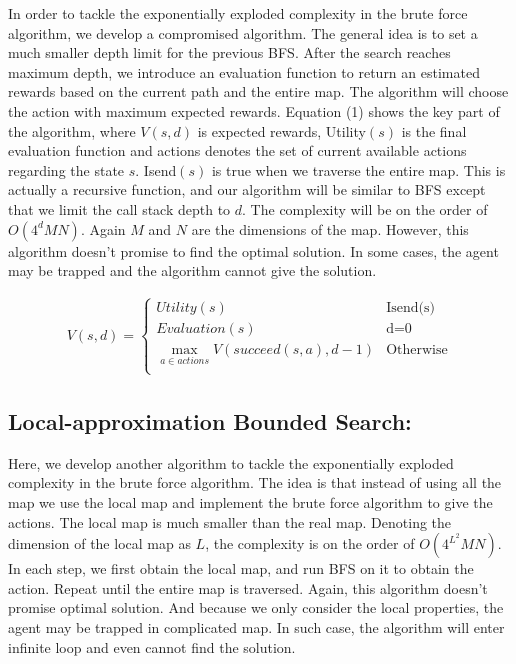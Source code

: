 \documentclass{article}
\begin{document}
\begin{normalsize}
                In order to tackle the exponentially exploded complexity in the brute force algorithm, we develop a compromised algorithm. The general idea is to set a much smaller depth limit for the previous BFS. After the search reaches maximum depth, we introduce an evaluation function to return an estimated rewards based on the current path and the entire map. The algorithm will choose the action with maximum expected rewards. Equation (1) shows the key part of the algorithm, where $V(s,d)$ is expected rewards, Utility$(s)$ is the final evaluation function and actions denotes the set of current available actions regarding the state $s$. Isend$(s)$ is true when we traverse the entire map. This is actually a recursive function, and our algorithm will be similar to BFS except that we limit the call stack depth to $d$. The complexity will be on the order of $O(4^dMN)$. Again $M$ and $N$ are the dimensions of the map. However, this algorithm doesn't promise to find the optimal solution. In some cases, the agent may be trapped and the algorithm cannot give the solution.
                
            \begin{ceqn}
            \begin{align}
                V(s,d)=\left\{
                \begin{array}{ll}
                                      Utility(s) & \text{Isend(s)}\\
                                      Evaluation(s) & \text{d=0}\\
                                      \max_{a \in actions} V(succeed(s,a),d-1) & \text{Otherwise}\\
                                    \end{array}
                \right.
            \end{align}
            \end{ceqn}

            
            \subsection{Local-approximation Bounded Search:}
            
                Here, we develop another algorithm to tackle the exponentially exploded complexity in the brute force algorithm. The idea is that instead of using all the map we use the local map and implement the brute force algorithm to give the actions. The local map is much smaller than the real map. Denoting the dimension of the local map as $L$, the complexity is on the order of $O(4^{L^2}MN)$. In each step, we first obtain the local map, and run BFS on it to obtain the action. Repeat until the entire map is traversed. Again, this algorithm doesn't promise optimal solution. And because we only consider the local properties, the agent may be trapped in complicated map. In such case, the algorithm will enter infinite loop and even cannot find the solution.
            

\end{normalsize}
\end{document}
